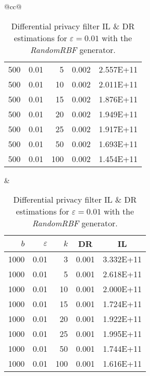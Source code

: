 \begin{table}[H]
\begin{tabular}{@{}cc@{}}
\begin{tabular}{@{}rrrrr@{}}
			500 & 0.01 & 5   & 0.002 & 2.557E+11 \\
			500 & 0.01 & 10  & 0.002 & 2.011E+11 \\
			500 & 0.01 & 15  & 0.002 & 1.876E+11 \\
			500 & 0.01 & 20  & 0.002 & 1.949E+11 \\
			500 & 0.01 & 25  & 0.002 & 1.917E+11 \\
			500 & 0.01 & 50  & 0.002 & 1.693E+11 \\
			500 & 0.01 & 100 & 0.002 & 1.454E+11 \\ \bottomrule
		\end{tabular}
		&
		\begin{tabular}{@{}rrrrr@{}}
			\toprule
			$b$ & $\varepsilon$ & $k$ & \multicolumn{1}{c}{DR} & \multicolumn{1}{c}{IL} \\ \midrule
			1000 & 0.01 & 3   & 0.001 & 3.332E+11 \\
			1000 & 0.01 & 5   & 0.001 & 2.618E+11 \\
			1000 & 0.01 & 10  & 0.001 & 2.000E+11 \\
			1000 & 0.01 & 15  & 0.001 & 1.724E+11 \\
			1000 & 0.01 & 20  & 0.001 & 1.922E+11 \\
			1000 & 0.01 & 25  & 0.001 & 1.995E+11 \\
			1000 & 0.01 & 50  & 0.001 & 1.744E+11 \\
			1000 & 0.01 & 100 & 0.001 & 1.616E+11 \\ \bottomrule
		\end{tabular}
	\end{tabular}
	\caption[Differential privacy filter DR \& IL estimations (RandomRBF), $\varepsilon = 0.01$.]{Differential privacy filter IL \& DR estimations for $\varepsilon = 0.01$ with the \textit{RandomRBF} generator.}
\end{table}

